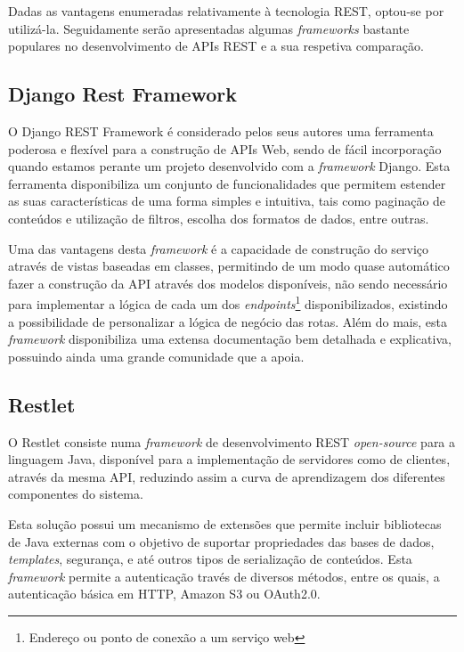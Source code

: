 Dadas as vantagens enumeradas relativamente à tecnologia \ac{REST}, optou-se por utilizá-la. Seguidamente serão apresentadas algumas \textit{frameworks} bastante populares no desenvolvimento de APIs \ac{REST} e a sua respetiva comparação. 



\subsection{Django Rest Framework}



O Django REST Framework é considerado pelos seus autores uma ferramenta poderosa e flexível para a construção de APIs Web\cite{restdjango}, sendo de fácil incorporação quando estamos perante um projeto desenvolvido com a \textit{framework} Django. Esta ferramenta disponibiliza um conjunto de funcionalidades que permitem estender as suas características de uma forma simples e intuitiva, tais como paginação de conteúdos e utilização de filtros, escolha dos formatos de dados, entre outras.


Uma das vantagens desta \textit{framework} é a capacidade de construção do serviço através de vistas baseadas em classes, permitindo de um modo quase automático fazer a construção da API através dos modelos disponíveis, não sendo necessário para implementar a lógica de cada um dos \textit{endpoints}\footnote{Endereço ou ponto de conexão a um serviço web} disponibilizados, existindo a possibilidade de personalizar a lógica de negócio das rotas. Além do mais, esta \textit{framework} disponibiliza uma extensa documentação bem detalhada e explicativa, possuindo ainda uma grande comunidade que a apoia. 












\subsection{Restlet}

O Restlet consiste numa \textit{framework} de desenvolvimento \ac{REST} \textit{open-source} para a linguagem Java, disponível para a implementação de servidores como de clientes, através da mesma \ac{API}, reduzindo assim a curva de aprendizagem dos diferentes componentes do sistema. 

Esta solução possui um mecanismo de extensões que permite incluir bibliotecas de Java externas com o objetivo de suportar propriedades das bases de dados, \textit{templates}, segurança, e até outros tipos de serialização de conteúdos. Esta \textit{framework} permite a autenticação través de diversos métodos, entre os quais, a autenticação básica em \ac{HTTP}, Amazon S3 ou OAuth2.0.

